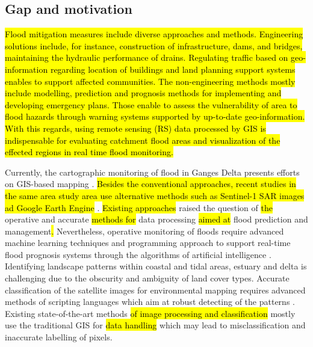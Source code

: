 \documentclass[water,article,submit,pdftex,moreauthors]{Definitions/mdpi}
\begin{document}
\subsection{Gap and motivation}

\hl{Flood mitigation measures include diverse approaches and methods. Engineering solutions include, for instance, construction of infrastructure, dams, and bridges, maintaining the hydraulic performance of drains. Regulating traffic based on geo-information regarding location of buildings and land planning support systems enables to support affected communities. The non-engineering methods mostly include modelling, prediction and prognosis methods for implementing and developing emergency plans. Those enable to assess the vulnerability of area to flood hazards through warning systems supported by up-to-date geo-information. With this regards, using remote sensing (RS) data processed by GIS is indispensable for evaluating catchment flood areas and visualization of the effected regions in real time flood monitoring.}

Currently, the cartographic monitoring of flood in Ganges Delta presents efforts on GIS-based mapping\hl{ }\cite{Sanyal2023,ISLAM2023167,RANA2023}. \hl{Besides the conventional approaches, recent studies in the same area study area use alternative methods such as Sentinel-1 SAR images ad Google Earth Engine} \cite{ChakmaAkter,SINGHA2020278}. \hl{Existing approaches} raised the question of\hl{ the }operative and accurate \hl{methods for }data processing \hl{aimed at} flood prediction and management\hl{. }Nevertheless, operative monitoring of floods require advanced machine learning techniques and programming approach to support real-time flood prognosis systems through the algorithms of artificial intelligence \cite{ZHAO2021126777}. Identifying landscape patterns within coastal and tidal areas, estuary and delta is challenging due to the obscurity and ambiguity of land cover types. Accurate classification of the satellite images for environmental mapping requires advanced methods of scripting languages which aim at robust detecting of the patterns \cite{YANG2020100413,Lemenkova202322,BEVERIDGE2020104843,SADIQ2023111233,Lemenkova202227}. Existing state-of-the-art methods \hl{of image processing and classification }mostly use the traditional GIS for \hl{data handling} which may lead to misclassification and inaccurate labelling of pixels. 
\end{document}
